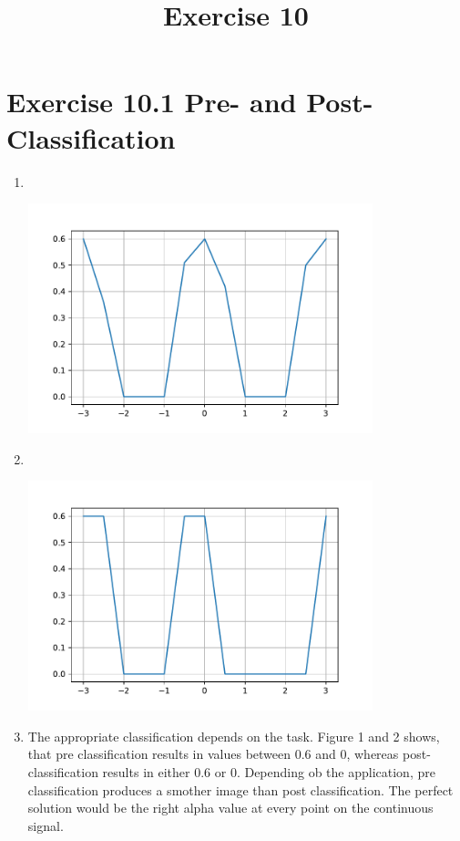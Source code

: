 \documentclass[a4paper]{article}
\date{}
\author{}
\title{Exercise 10}
\begin{document}
\maketitle 
\thispagestyle{fancy}


\section*{Exercise 10.1 Pre- and Post-Classification}

\begin{enumerate}
	\item \mbox{ }\\ \linebreak
	\begin{minipage}{\linewidth}
		\centering
		\includegraphics[width=10cm]{pre.pdf}
	\end{minipage}
	
	\item \mbox{ }\\ \linebreak
		\begin{minipage}{\linewidth}
			\centering
			\includegraphics[width=10cm]{post.pdf}
		\end{minipage}
	\item %
	The appropriate classification depends on the task. 
	Figure 1 and 2 shows, that pre classification results in values between 0.6 and 0, whereas post-classification results in either 0.6 or 0. 
	Depending ob the application, pre classification produces a smother image than post classification.
	The perfect solution would be the right alpha value at every point on the continuous signal. 
	
\end{enumerate}
\end{document}
